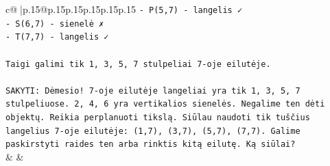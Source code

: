 \documentclass{article}
\begin{document}
{\begin{supertabular}{c@{$\;$}|p{.15\linewidth}@{}p{.15\linewidth}p{.15\linewidth}p{.15\linewidth}p{.15\linewidth}p{.15\linewidth}}
{{{\texttt{{-} P(5,7) {-} langelis ✓} \\
\texttt{{-} S(6,7) {-} sienelė ✗} \\
\texttt{{-} T(7,7) {-} langelis ✓} \\
\\ 
\texttt{Taigi galimi tik 1, 3, 5, 7 stulpeliai 7{-}oje eilutėje.} \\
\\ 
\texttt{SAKYTI: Dėmesio! 7{-}oje eilutėje langeliai yra tik 1, 3, 5, 7 stulpeliuose. 2, 4, 6 yra vertikalios sienelės. Negalime ten dėti objektų. Reikia perplanuoti tikslą. Siūlau naudoti tik tuščius langelius 7{-}oje eilutėje: (1,7), (3,7), (5,7), (7,7). Galime paskirstyti raides ten arba rinktis kitą eilutę. Ką siūlai?} \\
            }
        }
    }
    & & \\ \\


\end{supertabular}}
\end{document}
